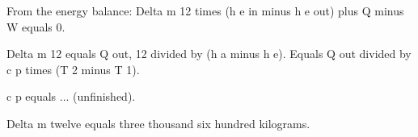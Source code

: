 From the energy balance:  
Delta m 12 times (h e in minus h e out) plus Q minus W equals 0.  

Delta m 12 equals Q out, 12 divided by (h a minus h e).  
Equals Q out divided by c p times (T 2 minus T 1).  

c p equals ... (unfinished).

Delta m twelve equals three thousand six hundred kilograms.
